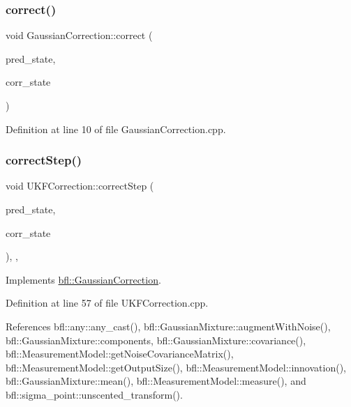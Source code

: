 \subsubsection{\texorpdfstring{correct()}{correct()}}
{\footnotesize\ttfamily void Gaussian\+Correction\+::correct (\begin{DoxyParamCaption}\item[{const \mbox{\hyperlink{classbfl_1_1GaussianMixture}{Gaussian\+Mixture}} \&}]{pred\+\_\+state,  }\item[{\mbox{\hyperlink{classbfl_1_1GaussianMixture}{Gaussian\+Mixture}} \&}]{corr\+\_\+state }\end{DoxyParamCaption})\hspace{0.3cm}{\ttfamily [inherited]}}



Definition at line 10 of file Gaussian\+Correction.\+cpp.

\mbox{\label{classbfl_1_1UKFCorrection_a08786378b99dbf0584edbba15bc89f99}} 
\subsubsection{\texorpdfstring{correct\+Step()}{correctStep()}}
{\footnotesize\ttfamily void U\+K\+F\+Correction\+::correct\+Step (\begin{DoxyParamCaption}\item[{const \mbox{\hyperlink{classbfl_1_1GaussianMixture}{bfl\+::\+Gaussian\+Mixture}} \&}]{pred\+\_\+state,  }\item[{\mbox{\hyperlink{classbfl_1_1GaussianMixture}{bfl\+::\+Gaussian\+Mixture}} \&}]{corr\+\_\+state }\end{DoxyParamCaption})\hspace{0.3cm}{\ttfamily [override]}, {\ttfamily [protected]}, {\ttfamily [virtual]}}



Implements \mbox{\hyperlink{classbfl_1_1GaussianCorrection_af30322d949e8135e1ec243bd6df00c18}{bfl\+::\+Gaussian\+Correction}}.



Definition at line 57 of file U\+K\+F\+Correction.\+cpp.



References bfl\+::any\+::any\+\_\+cast(), bfl\+::\+Gaussian\+Mixture\+::augment\+With\+Noise(), bfl\+::\+Gaussian\+Mixture\+::components, bfl\+::\+Gaussian\+Mixture\+::covariance(), bfl\+::\+Measurement\+Model\+::get\+Noise\+Covariance\+Matrix(), bfl\+::\+Measurement\+Model\+::get\+Output\+Size(), bfl\+::\+Measurement\+Model\+::innovation(), bfl\+::\+Gaussian\+Mixture\+::mean(), bfl\+::\+Measurement\+Model\+::measure(), and bfl\+::sigma\+\_\+point\+::unscented\+\_\+transform().

